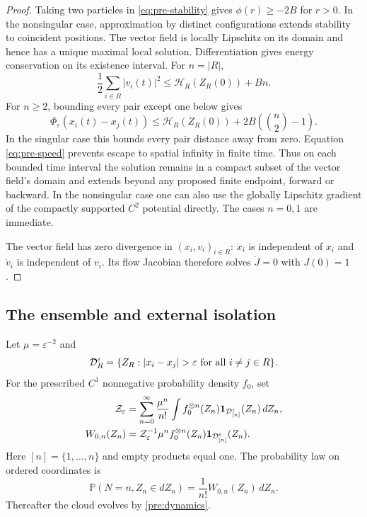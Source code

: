 \begin{proof}
Taking two particles in \eqref{eq:pre-stability} gives
$\phi(r)\geq-2B$ for $r>0$. In the nonsingular case, approximation by
distinct configurations extends stability to coincident positions.
The vector field is locally Lipschitz on its domain and hence has a
unique maximal local solution. Differentiation gives energy conservation
on its existence interval. For $n=|R|$,
\begin{equation}\label{eq:pre-speed}
 \frac12\sum_{i\in R}|v_i(t)|^2
       \leq\mathscr H_R(Z_R(0))+Bn.
\end{equation}
For $n\geq2$, bounding every pair except one below gives
\begin{equation}\label{eq:pre-pairupper}
 \Phi_\varepsilon(x_i(t)-x_j(t))
 \leq\mathscr H_R(Z_R(0))
             +2B\left(\binom n2-1\right).
\end{equation}
In the singular case this bounds every pair distance away from zero.
Equation \eqref{eq:pre-speed} prevents escape to spatial infinity in
finite time. Thus on each bounded time interval the solution remains in
a compact subset of the vector field's domain and extends beyond any
proposed finite endpoint, forward or backward. In the nonsingular case
one can also use the globally Lipschitz gradient of the compactly
supported $C^2$ potential directly. The cases $n=0,1$ are immediate.

The vector field has zero divergence in $(x_i,v_i)_{i\in R}$:
$\dot x_i$ is independent of $x_i$ and $\dot v_i$ is independent of
$v_i$. Its flow Jacobian therefore solves $\dot J=0$ with $J(0)=1$.
\end{proof}

\subsection{The ensemble and external isolation}

\begin{definition}
Let $\mu=\varepsilon^{-2}$ and
\[
 {\cal D}_R^\varepsilon
 =\{Z_R:|x_i-x_j|>\varepsilon\text{ for all }i\ne j\in R\}.
\]
For the prescribed $C^1$ nonnegative probability density $f_0$, set
\begin{align}
 {\cal Z}_\varepsilon
 &=\sum_{n=0}^\infty\frac{\mu^n}{n!}
   \int f_0^{\otimes n}(Z_n)
             \mathbf1_{{\cal D}_{[n]}^\varepsilon}(Z_n)\,dZ_n,
       \label{eq:pre-partition}\\
 W_{0,n}(Z_n)
 &={\cal Z}_\varepsilon^{-1}\mu^n f_0^{\otimes n}(Z_n)
             \mathbf1_{{\cal D}_{[n]}^\varepsilon}(Z_n).
       \label{eq:pre-ensemble}
\end{align}
Here $[n]=\{1,\ldots,n\}$ and empty products equal one.
The probability law on ordered coordinates is
\begin{equation}\label{pre:model}
 \mathbb P(N=n,Z_n\in dZ_n)=\frac1{n!}W_{0,n}(Z_n)\,dZ_n.
\end{equation}
Thereafter the cloud evolves by \eqref{pre:dynamics}.
\end{definition}


